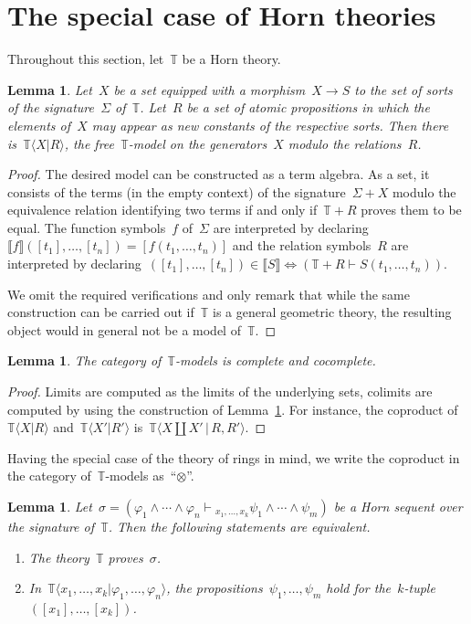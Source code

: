 \documentclass[oneside,reqno]{amsart}
\theoremstyle{definition}
\theoremstyle{plain}
\newtheorem{lemma}[defn]{Lemma}
\theoremstyle{remark}
\newcommand{\TT}{\mathbb{T}}
\renewcommand{\_}{\mathpunct{.}\,}
\newcommand{\?}{\,{:}\,}
\newcommand{\brak}[1]{\llbracket #1 \rrbracket}
\newcommand{\seq}[1]{\mathrel{\vdash\!\!\!_{#1}}}
\begin{document}
\section{The special case of Horn theories}

Throughout this section, let~$\TT$ be a Horn theory.

\begin{lemma}\label{lemma:free-models}
Let~$X$ be a set equipped with a morphism~$X \to S$ to the set of sorts
of the signature~$\Sigma$ of~$\TT$. Let~$R$ be a set of atomic propositions in which the
elements of~$X$ may appear as new constants of the respective sorts. Then there
is~$\TT\langle X | R \rangle$, the free~$\TT$-model on the generators~$X$ modulo
the relations~$R$.\end{lemma}

\begin{proof}The desired model can be constructed as a term algebra. As a set,
it consists of the terms (in the empty context) of the signature~$\Sigma + X$
modulo the equivalence relation identifying two terms if and only if~$\TT + R$
proves them to be equal. The function symbols~$f$ of~$\Sigma$ are interpreted
by declaring~$\brak{f}([t_1],\ldots,[t_n]) = [f(t_1,\ldots,t_n)]$ and the
relation symbols~$R$ are interpreted by declaring~$([t_1],\ldots,[t_n]) \in
\brak{S} \Leftrightarrow (\TT + R \vdash S(t_1,\ldots,t_n))$.

We omit the required verifications and only remark that while the same
construction can be carried out if~$\TT$ is a general geometric theory, the
resulting object would in general not be a model of~$\TT$.
\end{proof}

\begin{lemma}The category of~$\TT$-models is complete and
cocomplete.\end{lemma}

\begin{proof}Limits are computed as the limits of the underlying sets, colimits
are computed by using the construction of Lemma~\ref{lemma:free-models}. For
instance, the coproduct of~$\TT\langle X | R \rangle$ and~$\TT\langle X' | R'
\rangle$ is~$\TT\langle X \amalg X' \,|\, R, R' \rangle$.\end{proof}

Having the special case of the theory of rings in mind, we write the coproduct
in the category of~$\TT$-models as~``$\otimes$''.

\begin{lemma}Let~$\sigma = (\varphi_1 \wedge \cdots \wedge \varphi_n
\seq{x_1,\ldots,x_k} \psi_1 \wedge \cdots \wedge \psi_m)$ be a Horn sequent
over the signature of~$\TT$. Then the following statements are equivalent.
\begin{enumerate}
\item The theory~$\TT$ proves~$\sigma$.
\item In~$\TT\langle x_1,\ldots,x_k | \varphi_1,\ldots,\varphi_n \rangle$, the
propositions~$\psi_1,\ldots,\psi_m$ hold for
the~$k$-tuple~$([x_1],\ldots,[x_k])$.
\end{enumerate}
\end{lemma}
\end{document}
